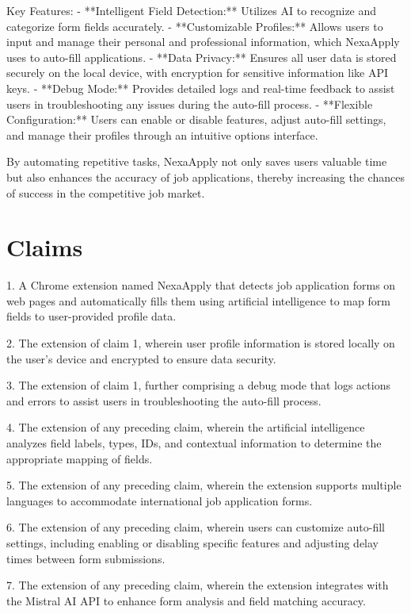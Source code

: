 \documentclass{article}
\begin{document}
Key Features:
- **Intelligent Field Detection:** Utilizes AI to recognize and categorize form fields accurately.
- **Customizable Profiles:** Allows users to input and manage their personal and professional information, which NexaApply uses to auto-fill applications.
- **Data Privacy:** Ensures all user data is stored securely on the local device, with encryption for sensitive information like API keys.
- **Debug Mode:** Provides detailed logs and real-time feedback to assist users in troubleshooting any issues during the auto-fill process.
- **Flexible Configuration:** Users can enable or disable features, adjust auto-fill settings, and manage their profiles through an intuitive options interface.

By automating repetitive tasks, NexaApply not only saves users valuable time but also enhances the accuracy of job applications, thereby increasing the chances of success in the competitive job market.

\section{Claims}
1. A Chrome extension named NexaApply that detects job application forms on web pages and automatically fills them using artificial intelligence to map form fields to user-provided profile data.

2. The extension of claim 1, wherein user profile information is stored locally on the user's device and encrypted to ensure data security.

3. The extension of claim 1, further comprising a debug mode that logs actions and errors to assist users in troubleshooting the auto-fill process.

4. The extension of any preceding claim, wherein the artificial intelligence analyzes field labels, types, IDs, and contextual information to determine the appropriate mapping of fields.

5. The extension of any preceding claim, wherein the extension supports multiple languages to accommodate international job application forms.

6. The extension of any preceding claim, wherein users can customize auto-fill settings, including enabling or disabling specific features and adjusting delay times between form submissions.

7. The extension of any preceding claim, wherein the extension integrates with the Mistral AI API to enhance form analysis and field matching accuracy.
\end{document}
